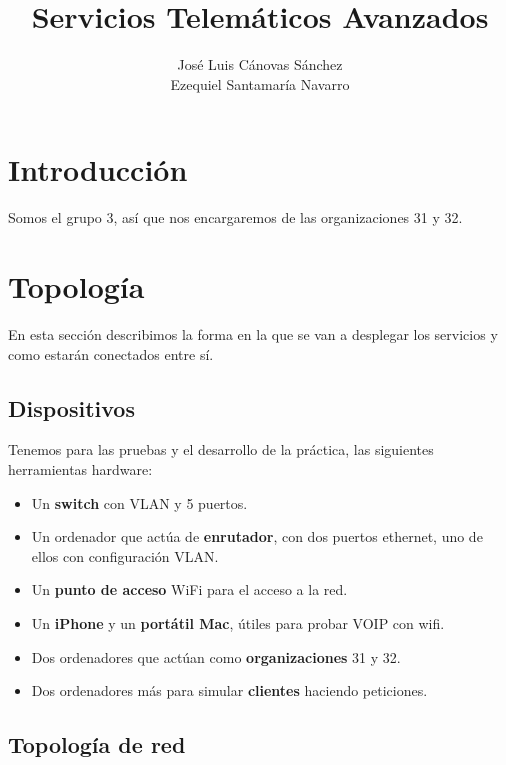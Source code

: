 \documentclass[]{article}
\title{Servicios Telemáticos Avanzados}
\author{José Luis Cánovas Sánchez\\Ezequiel Santamaría Navarro}
\begin{document}
\maketitle

\begin{abstract}
\end{abstract}

\tableofcontents


\section{Introducción}

Somos el grupo 3, así que nos encargaremos de las organizaciones 31 y 32.

\section{Topología}

En esta sección describimos la forma en la que se van a desplegar los servicios y como estarán
conectados entre sí.

\subsection{Dispositivos}

Tenemos para las pruebas y el desarrollo de la práctica, las siguientes herramientas hardware:

\begin{itemize}

	\item Un \textbf{switch} con VLAN y 5 puertos.
	\item Un ordenador que actúa de \textbf{enrutador}, con dos puertos ethernet, uno de ellos con configuración VLAN.
	\item Un \textbf{punto de acceso} WiFi para el acceso a la red.
	\item Un \textbf{iPhone} y un \textbf{portátil Mac}, útiles para probar VOIP con wifi.
	\item Dos ordenadores que actúan como \textbf{organizaciones} 31 y 32.
	\item Dos ordenadores más para simular \textbf{clientes} haciendo peticiones.

\end{itemize}

\subsection{Topología de red}
\end{document}
